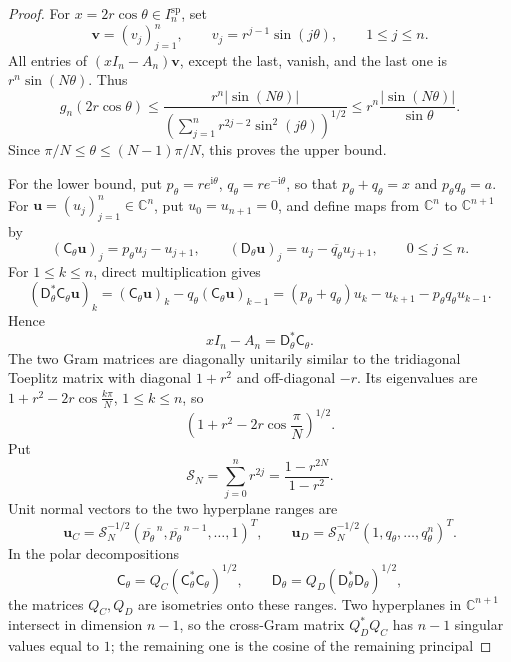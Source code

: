 \documentclass[review,hidelinks,onefignum,onetabnum]{siamart251216}
\newcommand{\C}{\mathbb C}
\newcommand{\ii}{\mathrm i}
\begin{document}
\begin{proof}
For \(x=2r\cos\theta\in I_n^{\mathrm{sp}}\), set
\[
 \boldsymbol v=(v_j)_{j=1}^n,\qquad
 v_j=r^{j-1}\sin(j\theta),\qquad1\leq j\leq n.
\]
All entries of \((xI_n-A_n)\boldsymbol v\), except the last, vanish, and
the last one
is \(r^n\sin(N\theta)\).  Thus
\[
 g_n(2r\cos\theta)
 \leq\frac{r^n|\sin(N\theta)|}
 {\left(\sum_{j=1}^nr^{2j-2}\sin^2(j\theta)\right)^{1/2}}
 \leq r^n\frac{|\sin(N\theta)|}{\sin\theta}.
\]
Since \(\pi/N\leq\theta\leq(N-1)\pi/N\), this proves the upper bound.

For the lower bound, put
\(p_\theta=re^{\ii\theta}\), \(q_\theta=re^{-\ii\theta}\), so that
\(p_\theta+q_\theta=x\) and \(p_\theta q_\theta=a\).  For
\(\boldsymbol u=(u_j)_{j=1}^n\in\C^n\), put \(u_0=u_{n+1}=0\), and
define maps from \(\C^n\) to \(\C^{n+1}\) by
\[
 (\mathsf{C}_\theta\boldsymbol u)_j=p_\theta u_j-u_{j+1},\qquad
 (\mathsf{D}_\theta\boldsymbol u)_j=u_j-\overline{q_\theta}u_{j+1},
 \qquad0\leq j\leq n.
\]
For \(1\leq k\leq n\), direct multiplication gives
\[
 (\mathsf{D}_\theta^*\mathsf{C}_\theta\boldsymbol u)_k
 =(\mathsf{C}_\theta\boldsymbol u)_k
 -q_\theta(\mathsf{C}_\theta\boldsymbol u)_{k-1}
 =(p_\theta+q_\theta)u_k-u_{k+1}-p_\theta q_\theta u_{k-1}.
\]
Hence
\begin{equation}\label{eq:rectangular-factorization}
 xI_n-A_n=\mathsf{D}_\theta^*\mathsf{C}_\theta.
\end{equation}
The two Gram matrices are
diagonally unitarily similar to the tridiagonal Toeplitz matrix with
diagonal \(1+r^2\) and off-diagonal \(-r\).  Its eigenvalues are
\(1+r^2-2r\cos\frac{k\pi}{N}\), \(1\leq k\leq n\), so
\begin{equation}\label{eq:rectangular-min}
 \left(1+r^2-2r\cos\frac{\pi}{N}\right)^{1/2}.
\end{equation}
Put
\[
 \mathcal S_N=\sum_{j=0}^nr^{2j}=\frac{1-r^{2N}}{1-r^2}.
\]
Unit normal vectors to the two hyperplane ranges are
\[
 \boldsymbol u_C=\mathcal S_N^{-1/2}
 (\overline{p_\theta}^{\,n},\overline{p_\theta}^{\,n-1},\ldots,1)^T,
 \qquad
 \boldsymbol u_D=\mathcal S_N^{-1/2}(1,q_\theta,\ldots,q_\theta^n)^T.
\]
In the polar decompositions
\[
 \mathsf{C}_\theta=Q_C(\mathsf{C}_\theta^*\mathsf{C}_\theta)^{1/2},
 \qquad
 \mathsf{D}_\theta=Q_D(\mathsf{D}_\theta^*\mathsf{D}_\theta)^{1/2},
\]
the matrices \(Q_C,Q_D\) are isometries onto these ranges.  Two
hyperplanes in \(\C^{n+1}\) intersect in dimension \(n-1\), so
the cross-Gram matrix \(Q_D^*Q_C\) has \(n-1\) singular values equal to
\(1\); the remaining one is the cosine of the remaining principal

\end{proof}
\end{document}
